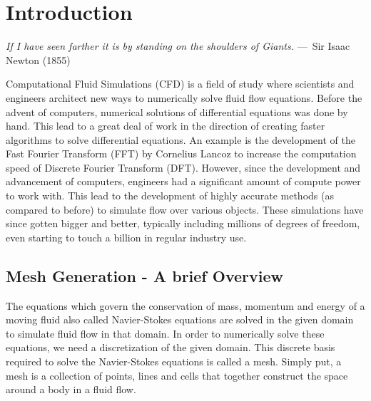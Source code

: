 
\chapter{Introduction}
\label{ch:Introduction}

\begin{epigraph}
    \emph{If I have seen farther it is by standing on the shoulders of
    Giants.} ---~Sir Isaac Newton (1855)
\end{epigraph}

Computational Fluid Simulations (CFD) is a field of study where scientists and engineers architect new ways to numerically solve fluid flow equations. Before the advent of computers, numerical solutions of differential equations was done by hand. This lead to a great deal of work in the direction of creating faster algorithms to solve differential equations. An example is the development of the Fast Fourier Transform (FFT) by Cornelius Lancoz to increase the computation speed of Discrete Fourier Transform (DFT). However, since the development and advancement of computers, engineers had a significant amount of compute power to work with. This lead to the development of highly accurate methods (as compared to before) to simulate flow over various objects. These simulations have since gotten bigger and better, typically including millions of degrees of freedom, even starting to touch a billion in regular industry use.

\section{Mesh Generation - A brief Overview}

The equations which govern the conservation of mass, momentum and energy of a moving fluid also called Navier-Stokes equations are solved in the given domain to simulate fluid flow in that domain. In order to numerically solve these equations, we need a discretization of the given domain. This discrete basis required to solve the Navier-Stokes equations is called a mesh. Simply put, a mesh is a collection of points, lines and cells that together construct the space around a body in a fluid flow.

